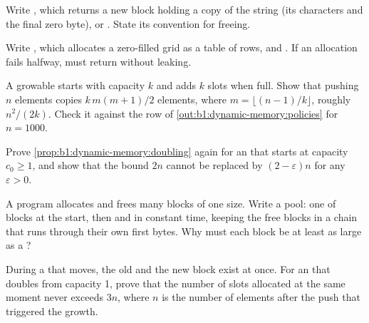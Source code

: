 \begin{exercise}[$\star\star$]\label{exo:b1:dynamic-memory:7}
Write , which returns a new  block holding a copy of the string 
(its characters and the final zero byte), or . State its convention for freeing.
\end{exercise}

\begin{exercise}[$\star\star$]\label{exo:b1:dynamic-memory:8}
Write , which allocates a zero-filled grid as a table of rows, and
. If an allocation fails halfway,  must return  without leaking.
\end{exercise}

\begin{exercise}[$\star\star$]\label{exo:b1:dynamic-memory:9}
A growable  starts with capacity $k$ and adds $k$ slots when full. Show that pushing $n$ elements copies
$k\,m(m+1)/2$ elements, where $m = \lfloor (n-1)/k \rfloor$, roughly $n^2/(2k)$. Check it against the  row of
\cref{out:b1:dynamic-memory:policies} for $n = 1000$.
\end{exercise}

\begin{exercise}[$\star\star\star$]\label{exo:b1:dynamic-memory:10}
Prove \cref{prop:b1:dynamic-memory:doubling} again for an  that starts at capacity $c_0 \geq 1$, and show that the
bound $2n$ cannot be replaced by $(2 - \varepsilon)n$ for any $\varepsilon > 0$.
\end{exercise}

\begin{exercise}[$\star\star\star$]\label{exo:b1:dynamic-memory:11}
A program allocates and frees many blocks of one size. Write a pool: one  of  blocks at the
start, then  and  in constant time, keeping the free blocks in a chain that runs through
their own first bytes. Why must each block be at least as large as a ?
\end{exercise}

\begin{exercise}[$\star\star\star$]\label{exo:b1:dynamic-memory:12}
During a  that moves, the old and the new block exist at once. For an  that doubles from capacity 1,
prove that the number of slots allocated at the same moment never exceeds $3n$, where $n$ is the number of elements
after the push that triggered the growth.
\end{exercise}


